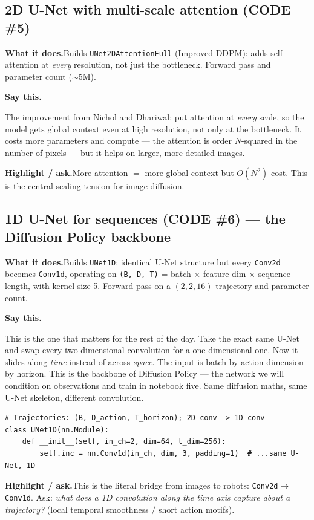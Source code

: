\documentclass[11pt]{article}
\newenvironment{saythis}{%
  \par\smallskip\noindent
  \begin{list}{}{%
    \setlength{\leftmargin}{1.2em}%
    \setlength{\rightmargin}{0.5em}%
    \setlength{\topsep}{2pt}%
  }\item\relax
  \color{sayrule}\textbf{Say this.}\hspace{0.4em}\color{black}\itshape
}{%
  \end{list}\par\smallskip
}
\newcommand{\highlight}[1]{\par\smallskip\noindent\textcolor{hlcolor}{\textbf{Highlight / ask.}}\hspace{0.4em}#1\par\smallskip}
\newcommand{\whatdoes}[1]{\par\noindent\textbf{What it does.}\hspace{0.4em}#1\par}
\begin{document}
\subsection{2D U-Net with multi-scale attention (CODE \#5)}
\whatdoes{Builds \texttt{UNet2DAttentionFull} (Improved DDPM): adds self-attention at \emph{every}
resolution, not just the bottleneck. Forward pass and parameter count ($\sim$5M).}
\begin{saythis}
The improvement from Nichol and Dhariwal: put attention at \emph{every} scale, so the model gets global
context even at high resolution, not only at the bottleneck. It costs more parameters and compute --- the
attention is order $N$-squared in the number of pixels --- but it helps on larger, more detailed images.
\end{saythis}
\highlight{More attention $=$ more global context but $O(N^2)$ cost. This is the central scaling tension
for image diffusion.}

\subsection{1D U-Net for sequences (CODE \#6) --- the Diffusion Policy backbone}
\whatdoes{Builds \texttt{UNet1D}: identical U-Net structure but every \texttt{Conv2d} becomes
\texttt{Conv1d}, operating on \texttt{(B, D, T)} = batch $\times$ feature dim $\times$ sequence length,
with kernel size 5. Forward pass on a $(2,2,16)$ trajectory and parameter count.}
\begin{saythis}
This is the one that matters for the rest of the day. Take the exact same U-Net and swap every
two-dimensional convolution for a one-dimensional one. Now it slides along \emph{time} instead of across
\emph{space}. The input is batch by action-dimension by horizon. This is the backbone of Diffusion
Policy --- the network we will condition on observations and train in notebook five. Same diffusion
maths, same U-Net skeleton, different convolution.
\end{saythis}
\begin{lstlisting}
# Trajectories: (B, D_action, T_horizon); 2D conv -> 1D conv
class UNet1D(nn.Module):
    def __init__(self, in_ch=2, dim=64, t_dim=256):
        self.inc = nn.Conv1d(in_ch, dim, 3, padding=1)  # ...same U-Net, 1D
\end{lstlisting}
\highlight{This is the literal bridge from images to robots: \texttt{Conv2d}$\to$\texttt{Conv1d}. Ask:
\emph{what does a 1D convolution along the time axis capture about a trajectory?} (local temporal
smoothness / short action motifs).}
\end{document}
